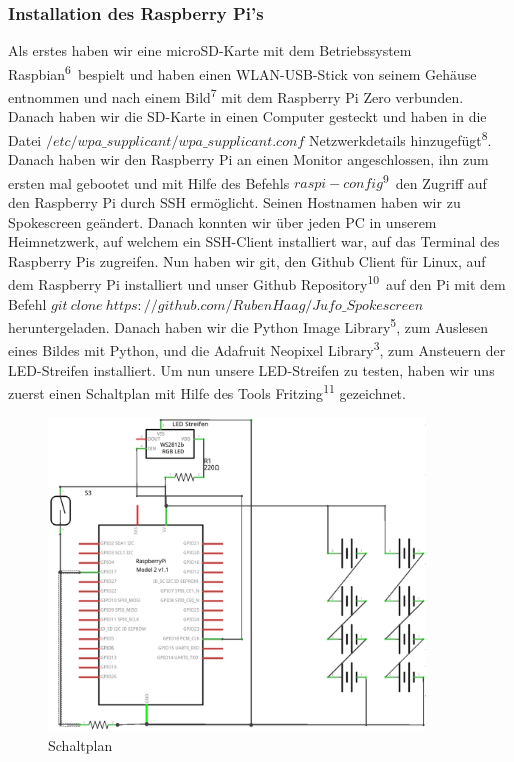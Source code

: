\documentclass [a4paper, 11pt] {article}
\begin{document}
\subsubsection{Installation des Raspberry Pi{'}s}
Als erstes haben wir eine microSD-Karte mit dem Betriebssystem Raspbian\textsuperscript{6}\ bespielt und haben einen WLAN-USB-Stick von seinem Gehäuse entnommen und nach einem Bild\textsuperscript{7} mit dem Raspberry Pi Zero verbunden. Danach haben wir die SD-Karte in einen Computer gesteckt und haben in die Datei {$/etc/wpa\_supplicant/wpa\_supplicant.conf$} Netzwerkdetails hinzugefügt\textsuperscript{8}.
Danach haben wir den Raspberry Pi an einen Monitor angeschlossen, ihn zum ersten mal gebootet und mit Hilfe des Befehls {$raspi-config$}\textsuperscript{9}\ den Zugriff auf den Raspberry Pi durch SSH ermöglicht. Seinen Hostnamen haben wir zu Spokescreen geändert. Danach konnten wir über jeden PC in unserem Heimnetzwerk, auf welchem ein SSH-Client installiert war, auf das Terminal des Raspberry Pis zugreifen.
Nun haben wir git, den Github Client für Linux, auf dem Raspberry Pi installiert und unser Github Repository\textsuperscript{10}\ auf den Pi mit dem Befehl {$git\ clone\ https://github.com/ RubenHaag/Jufo\_Spokescreen$} heruntergeladen. Danach haben wir die Python Image Library\textsuperscript{5}, zum Auslesen eines Bildes mit Python, und die Adafruit Neopixel Library\textsuperscript{3}, zum Ansteuern der LED-Streifen installiert. Um nun unsere LED-Streifen zu testen, haben wir uns zuerst einen Schaltplan mit Hilfe des Tools Fritzing\textsuperscript{11} gezeichnet.\\
\begin{figure}[h]
	\centering
	\includegraphics[width=10cm]{u.png}
	\caption{Schaltplan}
\end{figure}
\end{document}
